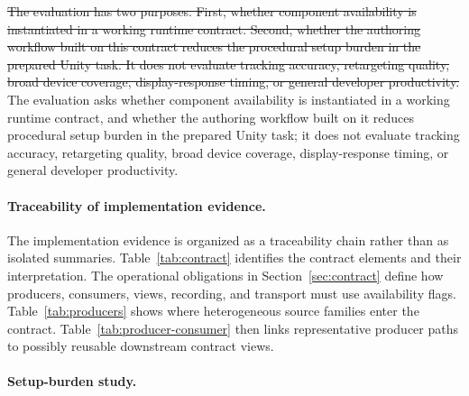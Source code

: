 \documentclass[runningheads]{llncs}
\newcommand{\radd}[1]{\textcolor{revadd}{#1}}
\newcommand{\rdel}[1]{\textcolor{revdel}{\sout{#1}}}
\newcommand{\rrep}[2]{\rdel{#1}\,\radd{#2}}
\newcommand{\radd}[1]{#1}
\newcommand{\rdel}[1]{}
\newcommand{\rrep}[2]{#2}
\begin{document}
\rrep{The evaluation has two purposes.
	First, whether component availability is instantiated in a working runtime contract.
	Second, whether the authoring workflow built on this contract reduces the procedural setup burden in the prepared Unity task.
	It does not evaluate tracking accuracy, retargeting quality, broad device coverage, display-response timing, or general developer productivity.}{The evaluation asks whether component availability is instantiated in a working runtime contract, and whether the authoring workflow built on it reduces procedural setup burden in the prepared Unity task; it does not evaluate tracking accuracy, retargeting quality, broad device coverage, display-response timing, or general developer productivity.}

\paragraph{Traceability of implementation evidence.}
	The implementation evidence is organized as a traceability chain rather than as isolated summaries.
	Table~\ref{tab:contract}  identifies the contract elements and their interpretation.
	The operational obligations in Section~\ref{sec:contract} define how producers, consumers, views, recording, and transport must use availability flags.
	Table~\ref{tab:producers} shows where heterogeneous source families enter the contract.
	Table~\ref{tab:producer-consumer} then links representative producer paths to possibly reusable downstream contract views.

\paragraph{Setup-burden study.}
\end{document}
